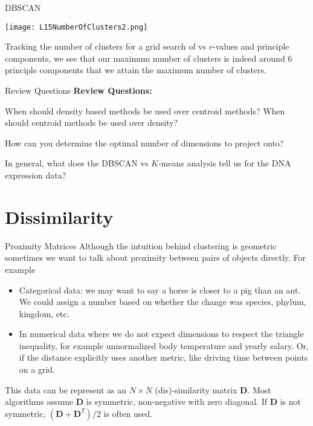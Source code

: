 \documentclass[10pt, table, dvipsnames,xcdraw,handout]{beamer}
\newcommand{\bfD}{\ensuremath{\mathbf{D}}}
\begin{document}
\begin{frame}[fragile]{DBSCAN}
  \begin{minipage}[t][0.5\textheight][t]{\textwidth}
	\centering \texttt{[image: L15NumberOfClusters2.png]} 
  \end{minipage}
  \vfill
\begin{minipage}[t][0.5\textheight][t]{\textwidth}
Tracking the number of clusters for a grid search of vs $r$-values and principle components, we see that our maximum number of clusters is indeed around 6 principle components that we attain the maximum number of clusters. 
\end{minipage}
\end{frame}





\begin{frame}[fragile]{Review Questions}
\textbf{Review Questions:}

When should density based methods be used over centroid methods? When should centroid methods be used over density?

How can you determine the optimal number of dimensions to project onto?


In general, what does the DBSCAN vs $K$-means analysis tell us for the DNA expression data? 
\end{frame}




\section{Dissimilarity}


\begin{frame}[fragile]{Proximity Matrices}
Although the intuition behind clustering is geometric sometimes we want to talk about proximity between pairs of objects directly. \pause For example

\begin{itemize}
\item[] Categorical data: we may want to say a horse is closer to a pig than an ant. We could assign a number based on whether the change was species, phylum, kingdom, etc. \pause
\item[] In numerical data where we do not expect dimensions to respect the triangle inequality, for example unnormalized body temperature and yearly salary. \pause Or, if the distance explicitly uses another metric, like driving time between points on a grid. \pause
\end{itemize}
This data can be represent as an $N\times N$  (dis)-similarity matrix $\bfD$. Most algorithms assume $\bfD$ is symmetric, non-negative with zero diagonal. \pause If $\bfD$ is not symmetric, $(\bfD+\bfD^T)/2$ is often used. 

\end{frame}
\end{document}
